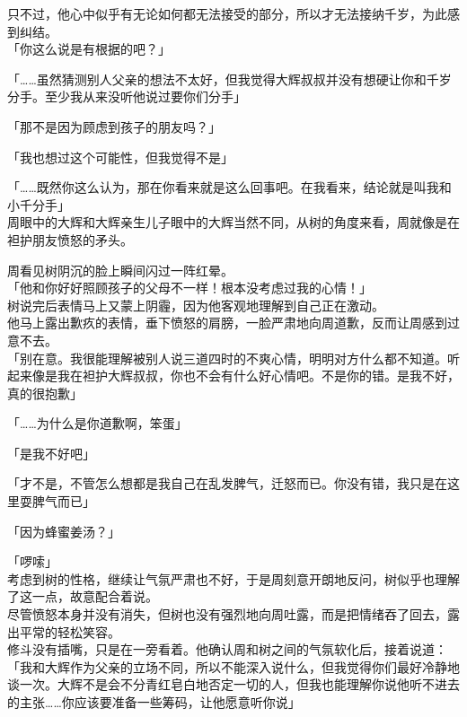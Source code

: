 只不过，他心中似乎有无论如何都无法接受的部分，所以才无法接纳千岁，为此感到纠结。\\

「你这么说是有根据的吧？」

「……虽然猜测别人父亲的想法不太好，但我觉得大辉叔叔并没有想硬让你和千岁分手。至少我从来没听他说过要你们分手」

「那不是因为顾虑到孩子的朋友吗？」

「我也想过这个可能性，但我觉得不是」

「……既然你这么认为，那在你看来就是这么回事吧。在我看来，结论就是叫我和小千分手」\\

周眼中的大辉和大辉亲生儿子眼中的大辉当然不同，从树的角度来看，周就像是在袒护朋友愤怒的矛头。

周看见树阴沉的脸上瞬间闪过一阵红晕。\\

「他和你好好照顾孩子的父母不一样！根本没考虑过我的心情！」\\

树说完后表情马上又蒙上阴霾，因为他客观地理解到自己正在激动。\\

他马上露出歉疚的表情，垂下愤怒的肩膀，一脸严肃地向周道歉，反而让周感到过意不去。\\

「别在意。我很能理解被别人说三道四时的不爽心情，明明对方什么都不知道。听起来像是我在袒护大辉叔叔，你也不会有什么好心情吧。不是你的错。是我不好，真的很抱歉」

「……为什么是你道歉啊，笨蛋」

「是我不好吧」

「才不是，不管怎么想都是我自己在乱发脾气，迁怒而已。你没有错，我只是在这里耍脾气而已」

「因为蜂蜜姜汤？」

「啰嗦」\\

考虑到树的性格，继续让气氛严肃也不好，于是周刻意开朗地反问，树似乎也理解了这一点，故意配合着说。\\

尽管愤怒本身并没有消失，但树也没有强烈地向周吐露，而是把情绪吞了回去，露出平常的轻松笑容。\\

修斗没有插嘴，只是在一旁看着。他确认周和树之间的气氛软化后，接着说道：\\

「我和大辉作为父亲的立场不同，所以不能深入说什么，但我觉得你们最好冷静地谈一次。大辉不是会不分青红皂白地否定一切的人，但我也能理解你说他听不进去的主张……你应该要准备一些筹码，让他愿意听你说」

